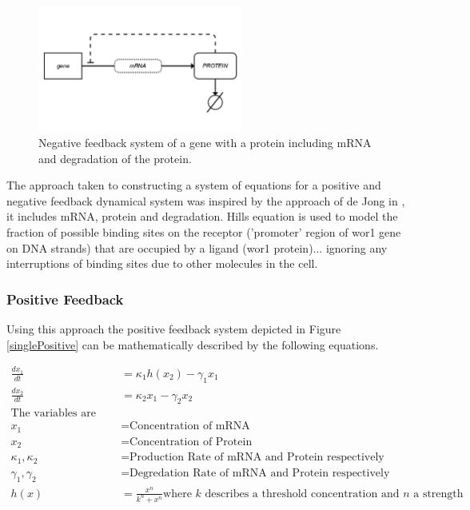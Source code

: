 \documentclass[]{article}
\begin{document}
        \begin{figure}[h]
        \centering
        \includegraphics[width=0.6\textwidth]{./figures/singleNegative.png}
        \caption{Negative feedback system of a gene with a protein including mRNA and degradation of the protein.}
        \label{singleNegative}
        \end{figure}
        
        The approach taken to constructing a system of equations for a positive and negative feedback dynamical system was inspired by the approach of de Jong in \cite{slides}, it includes mRNA, protein and degradation. Hills equation is used to model the fraction of possible binding sites on the receptor ('promoter' region of wor1 gene on DNA strands) that are occupied by a ligand (wor1 protein)... ignoring any interruptions of binding sites due to other molecules in the cell.
        
            \subsubsection{Positive Feedback} 
            Using this approach the positive feedback system depicted in Figure \ref{singlePositive} can be mathematically described by the following equations.
            
            \begin{align*}
                \frac{dx_1}{dt} &= \kappa_1 h(x_2) - \gamma_1 x_1 \\
                \frac{dx_2}{dt} &= \kappa_2x_1- \gamma_2 x_2\\
                \text{The variables are denoted as:}&\\
                x_1 &= \text{Concentration of mRNA}\\
                x_2 &= \text{Concentration of Protein}\\
                \kappa_1, \kappa_2 &= \text{Production Rate of mRNA and Protein respectively}\\
                \gamma_1, \gamma_2 &= \text{Degredation Rate of mRNA and Protein respectively}\\
                h(x) &= \frac{x^n}{k^n+x^n} \text{where $k$ describes a threshold concentration and $n$ a strength}
            \end{align*}
            
\end{document}

